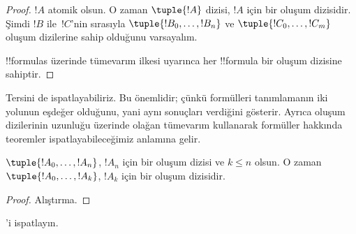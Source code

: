 \documentclass[../../../include/open-logic-section]{subfiles}
\begin{document}
\begin{proof}
$!A$ atomik olsun. O zaman $\tuple{!A}$ dizisi, $!A$ için bir oluşum
dizisidir.
%
Şimdi $!B$ ile~$!C$'nin sırasıyla $\tuple{!B_0,\dotsc,!B_n}$ ve
$\tuple{!C_0,\dotsc,!C_m}$ oluşum dizilerine sahip olduğunu varsayalım.
%
\begin{enumerate}
\end{enumerate}
!!{formula}s üzerinde tümevarım ilkesi uyarınca her !!{formula} bir
oluşum dizisine sahiptir.
\end{proof}

Tersini de ispatlayabiliriz. Bu önemlidir; çünkü formülleri tanımlamanın
iki yolunun eşdeğer olduğunu, yani aynı sonuçları verdiğini gösterir.
Ayrıca oluşum dizilerinin uzunluğu üzerinde olağan tümevarım kullanarak
formüller hakkında teoremler ispatlayabileceğimiz anlamına gelir.

\begin{lem}
$\tuple{!A_0,\dotsc,!A_n}$, $!A_n$ için bir oluşum dizisi ve $k \leq n$
olsun. O zaman $\tuple{!A_0,\dotsc,!A_k}$, $!A_k$ için bir oluşum
dizisidir.
\end{lem}

\begin{proof}
Alıştırma.
\end{proof}

\begin{prob}
'i ispatlayın.
\end{prob}
\end{document}
